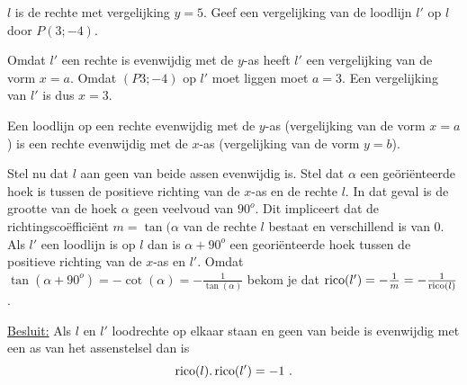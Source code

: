 \begin{voorbeeld}
	$l$ is de rechte met vergelijking $y=5$.
Geef een vergelijking van de loodlijn $l'$ op $l$ door $P(3;-4)$.

\begin{center}
	
\end{center}


Omdat $l'$ een rechte is evenwijdig met de $y$-as heeft $l'$ een vergelijking van de vorm $x=a$.
Omdat $(P3;-4)$ op $l'$ moet liggen moet $a=3$.
Een vergelijking van $l'$ is dus $x=3$.

Een loodlijn op een rechte evenwijdig met de $y$-as (vergelijking van de vorm $x=a$) is een rechte evenwijdig met de $x$-as (vergelijking van de vorm $y=b$).

Stel nu dat $l$ aan geen van beide assen evenwijdig is.
Stel dat $\alpha$ een ge\"ori\"enteerde hoek is tussen de positieve richting van de $x$-as en de rechte $l$.
In dat geval is de grootte van de hoek $\alpha$ geen veelvoud van $90^o$.
Dit impliceert dat de richtingsco\"effici\"ent $m=\tan (\alpha$ van de rechte $l$ bestaat en verschillend is van 0.
Als $l'$ een loodlijn is op $l$ dan is $\alpha + 90^o$ een geori\"enteerde hoek tussen de positieve richting van de $x$-as en $l'$.
Omdat $\tan (\alpha + 90^o)=-\cot (\alpha)=-\frac{1}{\tan (\alpha)}$  bekom je dat $\operatorname{rico} (l')=-\frac{1}{m}=-\frac{1}{\operatorname{rico} (l)}$.

\underline {Besluit:} Als $l$ en $l'$ loodrechte op elkaar staan en geen van beide is evenwijdig met een as van het assenstelsel dan is
\[
\operatorname{rico} (l).\operatorname{rico} (l')=-1 \text { .}
\]

\end{voorbeeld}


